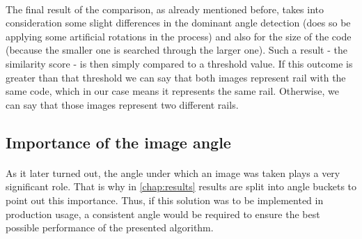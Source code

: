 \paragraph{}
The final result of the comparison, as already mentioned before, takes into consideration some slight differences in the dominant angle detection (does so be applying some artificial rotations in the process) and also for the size of the code (because the smaller one is searched through the larger one). Such a result - the similarity score - is then simply compared to a threshold value. If this outcome is greater than that threshold we can say that both images represent rail with the same code, which in our case means it represents the same rail. Otherwise, we can say that those images represent two different rails.

\subsection{Importance of the image angle} \label{subsect:angle_importance}
\paragraph{}
As it later turned out, the angle under which an image was taken plays a very significant role. That is why in \autoref{chap:results} results are split into angle buckets to point out this importance. Thus, if this solution was to be implemented in production usage, a consistent angle would be required to ensure the best possible performance of the presented algorithm.










